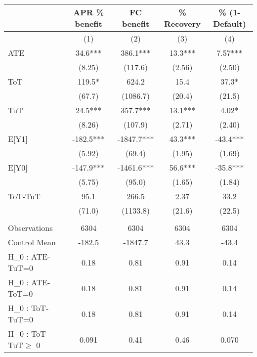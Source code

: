 \begin{tabular}{lcccc}
\toprule
      & APR \% benefit & FC benefit & \% Recovery & \% (1-Default) \\
\midrule
      & (1)   & (2)   & (3)   & (4) \\
\midrule
\midrule
ATE   & 34.6*** & 386.1*** & 13.3*** & 7.57*** \\
      & (8.25) & (117.6) & (2.56) & (2.50) \\
ToT   & 119.5* & 624.2 & 15.4  & 37.3* \\
      & (67.7) & (1086.7) & (20.4) & (21.5) \\
TuT   & 24.5*** & 357.7*** & 13.1*** & 4.02* \\
      & (8.26) & (107.9) & (2.71) & (2.40) \\
E[Y1] & -182.5*** & -1847.7*** & 43.3*** & -43.4*** \\
      & (5.92) & (69.4) & (1.95) & (1.69) \\
E[Y0] & -147.9*** & -1461.6*** & 56.6*** & -35.8*** \\
      & (5.75) & (95.0) & (1.65) & (1.84) \\
\midrule
ToT-TuT & 95.1  & 266.5 & 2.37  & 33.2 \\
      & (71.0) & (1133.8) & (21.6) & (22.5) \\
      &       &       &       &  \\
\midrule
Observations & 6304  & 6304  & 6304  & 6304 \\
Control Mean & -182.5 & -1847.7 & 43.3  & -43.4 \\
H_0 : ATE-TuT=0 & 0.18  & 0.81  & 0.91  & 0.14 \\
H_0 : ATE-ToT=0 & 0.18  & 0.81  & 0.91  & 0.14 \\
H_0 : ToT-TuT=0 & 0.18  & 0.81  & 0.91  & 0.14 \\
H_0 : ToT-TuT$\geq$ 0 & 0.091 & 0.41  & 0.46  & 0.070 \\
\bottomrule
\bottomrule
\end{tabular}%
